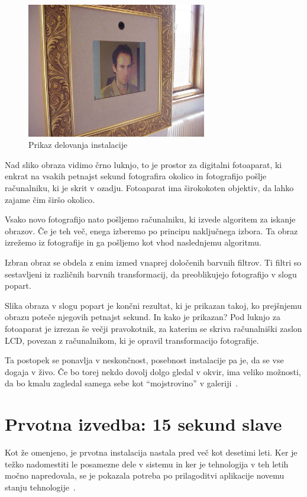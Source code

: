 \documentclass[a4paper, 12pt]{book}
\begin{document}
\begin{figure}
    \centering
    \includegraphics[width=0.7\textwidth]{15sec}
    \caption{Prikaz delovanja instalacije}
    \label{fig:15sec}
\end{figure}

Nad sliko obraza vidimo črno luknjo, to je prostor za digitalni fotoaparat, ki
enkrat na vsakih petnajst sekund fotografira okolico in fotografijo pošlje
računalniku, ki je skrit v ozadju. Fotoaparat ima širokokoten objektiv, da
lahko zajame čim širšo okolico.

Vsako novo fotografijo nato pošljemo računalniku, ki izvede algoritem za
iskanje obrazov. Če je teh več, enega izberemo po principu naključnega
izbora. Ta obraz izrežemo iz fotografije in ga pošljemo kot vhod
naslednjemu algoritmu.

Izbran obraz se obdela z enim izmed vnaprej določenih barvnih filtrov. Ti
filtri so sestavljeni iz različnih barvnih transformacij, da preoblikujejo
fotografijo v slogu popart. 

Slika obraza v slogu popart je končni rezultat, ki je prikazan takoj, ko
prejšnjemu obrazu poteče njegovih petnajst sekund. In kako je prikazan? Pod
luknjo za fotoaparat je izrezan še večji pravokotnik, za katerim se skriva
računalniški zaslon LCD, povezan z računalnikom, ki je opravil
transformacijo fotografije.

Ta postopek se ponavlja v neskončnost, posebnost instalacije pa je, da se vse
dogaja v živo. Če bo torej nekdo dovolj dolgo gledal v okvir, ima veliko
možnosti, da bo kmalu zagledal samega sebe kot ``mojstrovino'' v
galeriji~\cite{lieser2010world}.


\chapter{Prvotna izvedba: 15 sekund slave}
\label{ch:prvotnaIzvedba15}
Kot že omenjeno, je prvotna instalacija nastala pred več kot desetimi leti. Ker
je težko nadomestiti le posamezne dele v sistemu in ker je tehnologija v teh
letih močno napredovala, se je pokazala potreba po prilagoditvi aplikacije
novemu stanju tehnologije~\cite{trifonova}.
\end{document}
